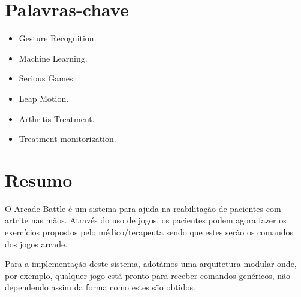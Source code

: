\documentclass{TTUPhD}
\begin{document}
\newpage


\tableofcontents

%

\section*{Palavras-chave}

\begin{itemize}
    \item Gesture Recognition.
    \item Machine Learning.
    \item Serious Games.
    \item Leap Motion.
    \item Arthritis Treatment.
    \item Treatment monitorization.
\end{itemize}

\section*{Resumo}

O Arcade Battle é um sistema para ajuda na reabilitação de pacientes com artrite nas mãos.
Através do uso de jogos, os pacientes podem agora fazer os exercícios propostos pelo médico/terapeuta sendo que estes serão os comandos dos jogos arcade.

Para a implementação deste sistema, adotámos uma arquitetura modular onde, por exemplo, qualquer jogo está pronto para receber comandos genéricos, não dependendo assim da forma como estes são obtidos.
\end{document}
